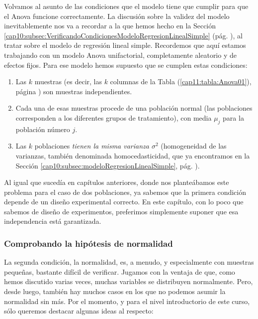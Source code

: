 Volvamos al asunto de las condiciones que el modelo tiene que cumplir para que el Anova funcione correctamente. La discusión sobre la validez del modelo inevitablemente nos va a recordar a la que hemos hecho en la Sección \ref{cap10:subsec:VerificandoCondicionesModeloRegresionLinealSimple} (pág. \pageref{cap10:subsec:VerificandoCondicionesModeloRegresionLinealSimple}), al tratar sobre el modelo de regresión lineal simple. Recordemos que aquí estamos trabajando con un modelo Anova unifactorial, completamente aleatorio y de efectos fijos. Para ese modelo hemos supuesto que se cumplen estas condiciones:
    \begin{enumerate}
        \item Las $k$ muestras (es decir, las $k$ columnas de la Tabla (\ref{cap11:tabla:Anova01}), página \pageref{cap11:tabla:Anova01}) son muestras independientes.

        \item Cada una de esas muestras procede de una población normal (las poblaciones corresponden a los diferentes grupos de tratamiento), con media $\mu_j$ para la población número $j$.

        \item Las $k$ poblaciones {\em tienen la misma varianza $\sigma^2$} (homogeneidad de las varianzas, también denominada homocedasticidad, que ya encontramos en la Sección \ref{cap10:subsec:modeloRegresionLinealSimple}, pág. \pageref{cap10:subsec:modeloRegresionLinealSimple}).
    \end{enumerate}
Al igual que sucedía en capítulos anteriores, donde nos planteábamos este problema para el caso de
dos poblaciones, ya sabemos que la primera condición depende de un diseño experimental correcto. En
este capítulo, con lo poco que sabemos de diseño de experimentos, preferimos  simplemente suponer
que esa independencia está garantizada.

\subsubsection{Comprobando la hipótesis de normalidad}
\label{cap11:subsubsec:ComprobandoHipotesisNormalidadAnova}

La segunda condición, la normalidad, es, a menudo, y especialmente con muestras pequeñas, bastante difícil de verificar. Jugamos con la ventaja de que, como hemos discutido varias veces, muchas variables se distribuyen normalmente. Pero, desde luego, también hay muchos casos en los que no podemos asumir la normalidad sin más. Por el momento, y para el nivel introductorio de este curso, sólo queremos destacar algunas ideas al respecto:

